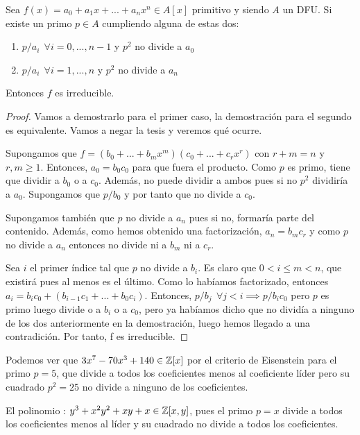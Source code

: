 \begin{nprop}
	Sea $f(x)=a_0+a_1x+...+a_nx^n \in A[x]$ primitivo y siendo $A$ un DFU.
Si existe un primo $p\in A$ cumpliendo alguna de estas dos:
	\begin{enumerate}
	\item $p/a_i \ \ \forall i = 0,...,n-1$ y $p^2$ no divide a $a_0$
	\item $p/a_i \ \ \forall i=1,...,n$ y $p^2$ no divide a $a_n$
\end{enumerate}
Entonces $f$ es irreducible.

\end{nprop}
\begin{proof}
	Vamos a demostrarlo para el primer caso, la demostración para el segundo es equivalente. Vamos a negar la tesis y veremos qué ocurre.

	Supongamos que $f=(b_0+...+b_mx^m)(c_0+...+c_rx^r)$ con $r+m=n$ y $r,m \geq 1$. Entonces, $a_0=b_0c_0$ para que fuera el producto. Como $p$ es primo, tiene que dividir a $b_0$ o a $c_0$. Además, no puede dividir a ambos pues si no $p^2$ dividiría a $a_0$. Supongamos que $p/b_0$ y por tanto que no divide a $c_0$.

	Supongamos también que $p$ no divide a $a_n$ pues si no, formaría parte del contenido. Además, como hemos obtenido una factorización, $a_n = b_mc_r$ y como $p$ no divide a $a_n$ entonces no divide ni a $b_m$ ni a $c_r$.

	Sea $i$ el primer índice tal que $p$ no divide a $b_i$. Es claro que $0<i \leq m < n$, que existirá pues al menos es el último. Como lo habíamos factorizado, entonces $a_i = b_ic_0+(b_{i-1}c_1+...+b_0c_i)$. Entonces, $p/b_j \ \ \forall j < i \implies p/b_ic_0$ pero $p$ es primo luego divide o a $b_i$ o a $c_0$, pero ya habíamos dicho que no dividía a ninguno de los dos anteriormente en la demostración, luego hemos llegado a una contradición. Por tanto, f es irreducible.
\end{proof}

\begin{ejemplo}
	Podemos ver que $3x^7-70x^3+140 \in \mathbb{Z}[x]$ por el criterio de Eisenstein para el primo $p=5$, que divide a todos los coeficientes menos al coeficiente líder pero su cuadrado $p^2 = 25$ no divide a ninguno de los coeficientes.
\end{ejemplo}
\begin{ejemplo}[2]
	El polinomio : $y^3 + x^2y^2 +xy + x \in \mathbb{Z}[x,y]$, pues el primo $p=x$ divide a todos los coeficientes menos al líder y su cuadrado no divide a todos los coeficientes.
\end{ejemplo}


